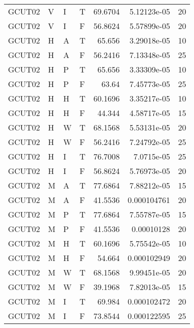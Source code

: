 \begin{longtable}{llllrrr}
    GCUT02   & V     & I     & T          & 69.6704    & 5.12123e-05 & 20       \\
    GCUT02   & V     & I     & F          & 56.8624    & 5.57899e-05 & 20       \\
    GCUT02   & H     & A     & T          & 65.656     & 3.29018e-05 & 10       \\
    GCUT02   & H     & A     & F          & 56.2416    & 7.13348e-05 & 25       \\
    GCUT02   & H     & P     & T          & 65.656     & 3.33309e-05 & 10       \\
    GCUT02   & H     & P     & F          & 63.64      & 7.45773e-05 & 25       \\
    GCUT02   & H     & H     & T          & 60.1696    & 3.35217e-05 & 10       \\
    GCUT02   & H     & H     & F          & 44.344     & 4.58717e-05 & 15       \\
    GCUT02   & H     & W     & T          & 68.1568    & 5.53131e-05 & 20       \\
    GCUT02   & H     & W     & F          & 56.2416    & 7.24792e-05 & 25       \\
    GCUT02   & H     & I     & T          & 76.7008    & 7.0715e-05  & 25       \\
    GCUT02   & H     & I     & F          & 56.8624    & 5.76973e-05 & 20       \\
    GCUT02   & M     & A     & T          & 77.6864    & 7.88212e-05 & 15       \\
    GCUT02   & M     & A     & F          & 41.5536    & 0.000104761 & 20       \\
    GCUT02   & M     & P     & T          & 77.6864    & 7.55787e-05 & 15       \\
    GCUT02   & M     & P     & F          & 41.5536    & 0.00010128  & 20       \\
    GCUT02   & M     & H     & T          & 60.1696    & 5.75542e-05 & 10       \\
    GCUT02   & M     & H     & F          & 54.664     & 0.000102949 & 20       \\
    GCUT02   & M     & W     & T          & 68.1568    & 9.99451e-05 & 20       \\
    GCUT02   & M     & W     & F          & 39.1968    & 7.82013e-05 & 15       \\
    GCUT02   & M     & I     & T          & 69.984     & 0.000102472 & 20       \\
    GCUT02   & M     & I     & F          & 73.8544    & 0.000122595 & 25       \\

\end{longtable}

